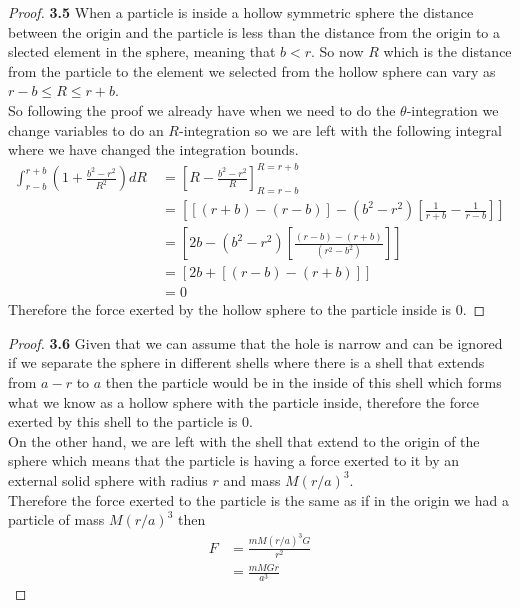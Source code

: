 \documentclass[11pt]{article}
\begin{document}
	\begin{proof}{\textbf{3.5}}
        When a particle is inside a hollow symmetric sphere the distance
        between the origin and the particle is less than the distance from the
        origin to a slected element in the sphere, meaning that $b < r$. So now
        $R$ which is the distance from the particle to the element we selected
        from the hollow sphere can vary as $r-b \leq R \leq r+b$.\\
        So following the proof we already have when we need to do the
        $\theta$-integration we change variables to do an $R$-integration so
        we are left with the following integral where we have changed the
        integration bounds.
        \begin{align*}
            \int_{r-b}^{r+b} \left( 1 + \frac{b^2 - r^2}{R^2} \right) dR \ 
                &= \left[R - \frac{b^2 - r^2}{R} \right]_{R=r-b}^{R=r+b} \\
                &= \left[ [(r+b) - (r-b)] - (b^2 - r^2)\left[ \frac{1}{r+b} - \frac{1}{r-b} \right] \right] \\
                &= \left[ 2b - (b^2 - r^2) \left[ \frac{(r-b) - (r+b)}{(r^2 - b^2)} \right] \right] \\
                &= \left[ 2b + \left[(r-b) - (r+b)\right] \right] \\
                &= 0
        \end{align*}
        Therefore the force exerted by the hollow sphere to the particle inside
        is 0.
    \end{proof}
	\begin{proof}{\textbf{3.6}}
        Given that we can assume that the hole is narrow and can be ignored if
        we separate the sphere in different shells where there is a shell that
        extends from $a-r$ to $a$ then the particle would be in the inside of 
        this shell which forms what we know as a hollow sphere with the
        particle inside, therefore the force exerted by this shell to the
        particle is 0. \\
        On the other hand, we are left with the shell that extend to the origin
        of the sphere which means that the particle is having a force exerted
        to it by an external solid sphere with radius $r$ and mass $M(r/a)^3$.\\
        Therefore the force exerted to the particle is the same as if in the
        origin we had a particle of mass $M(r/a)^3$ then
        \begin{align*}
            F &= \frac{mM(r/a)^3G}{r^2} \\
              &= \frac{mMGr}{a^3}
        \end{align*}
    \end{proof}
\end{document}
